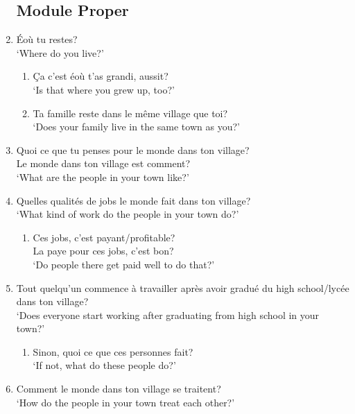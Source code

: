 \begin{enumerate}
    \subsection{Module Proper}
        \item Éoù tu restes?\\
              `Where do you live?'
        \begin{enumerate}
            \item Ça c'est éoù t'as grandi, aussit?\\
                  `Is that where you grew up, too?'
            \item Ta famille reste dans le même village que toi?\\
                  `Does your family live in the same town as you?'
        \end{enumerate}
        \item Quoi ce que tu penses pour le monde dans ton village?\\
              Le monde dans ton village est comment?\\
              `What are the people in your town like?'
        \item Quelles qualités de jobs le monde fait dans ton village?\\
              `What kind of work do the people in your town do?'
        \begin{enumerate}
            \item Ces jobs, c'est payant/profitable?\\
                  La paye pour ces jobs, c'est bon?\\
                  `Do people there get paid well to do that?'
        \end{enumerate}
        \item Tout quelqu'un commence à travailler après avoir gradué du high school/lycée dans ton village?\\
              `Does everyone start working after graduating from high school in your town?'
            \begin{enumerate}
                \item Sinon, quoi ce que ces personnes fait?\\
                      `If not, what do these people do?'
            \end{enumerate}
        \item Comment le monde dans ton village se traitent?\\
              `How do the people in your town treat each other?'

\end{enumerate}
